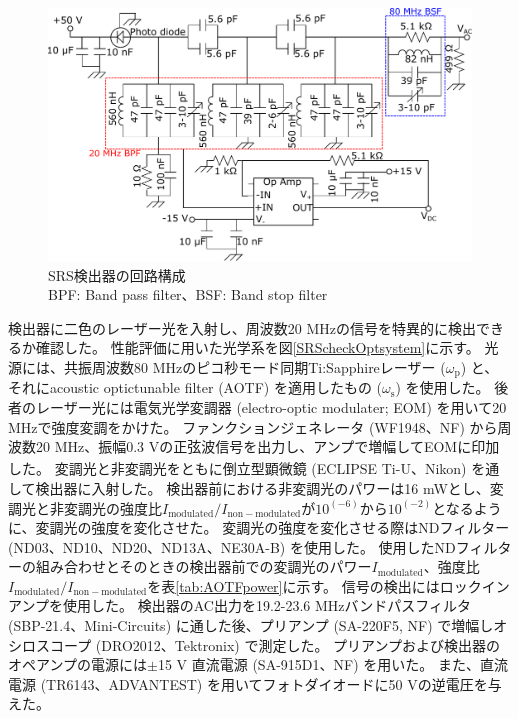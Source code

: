 \documentclass[uplatex,a4paper]{jsarticle}
\begin{document}
\begin{figure}[H]
	\centering
	\includegraphics[width=15cm,pagebox=cropbox,clip]{figure/2_4_SRSdetector_cirkit50Vdc.pdf}
	\caption{SRS検出器の回路構成\\BPF: Band pass filter、BSF: Band stop filter	\label{SRSdetector_cirkit}}
\end{figure}

検出器に二色のレーザー光を入射し、周波数20 MHzの信号を特異的に検出できるか確認した。
性能評価に用いた光学系を図\ref{SRScheckOptsystem}に示す。
光源には、共振周波数80 MHzのピコ秒モード同期Ti:Sapphireレーザー ($\omega_{\mathrm{p}}$) と、それにacoustic optictunable filter (AOTF) を適用したもの ($\omega_{\mathrm{s}}$) を使用した。
後者のレーザー光には電気光学変調器 (electro-optic modulater; EOM) を用いて20 MHzで強度変調をかけた。
ファンクションジェネレータ (WF1948、NF) から周波数20 MHz、振幅0.3 \si{V_{}}の正弦波信号を出力し、アンプで増幅してEOMに印加した。
変調光と非変調光をともに倒立型顕微鏡 (ECLIPSE Ti-U、Nikon) を通して検出器に入射した。
検出器前における非変調光のパワーは16 mWとし、変調光と非変調光の強度比${I_{\mathrm{modulated}}/I_{\mathrm{non-modulated}}}$が$10^(-6)$から$10^(-2)$となるように、変調光の強度を変化させた。
変調光の強度を変化させる際はNDフィルター (ND03、ND10、ND20、ND13A、NE30A-B) を使用した。
使用したNDフィルターの組み合わせとそのときの検出器前での変調光のパワー$I_{\mathrm{modulated}}$、強度比${I_{\mathrm{modulated}}/I_{\mathrm{non-modulated}}}$を表\ref{tab:AOTFpower}に示す。
信号の検出にはロックインアンプを使用した。
検出器のAC出力を19.2-23.6 MHzバンドパスフィルタ (SBP-21.4、Mini-Circuits) に通した後、プリアンプ (SA-220F5, NF) で増幅しオシロスコープ (DRO2012、Tektronix) で測定した。
プリアンプおよび検出器のオペアンプの電源には$\pm$15 V 直流電源 (SA-915D1、NF) を用いた。
また、直流電源 (TR6143、ADVANTEST) を用いてフォトダイオードに50 Vの逆電圧を与えた。
\end{document}
